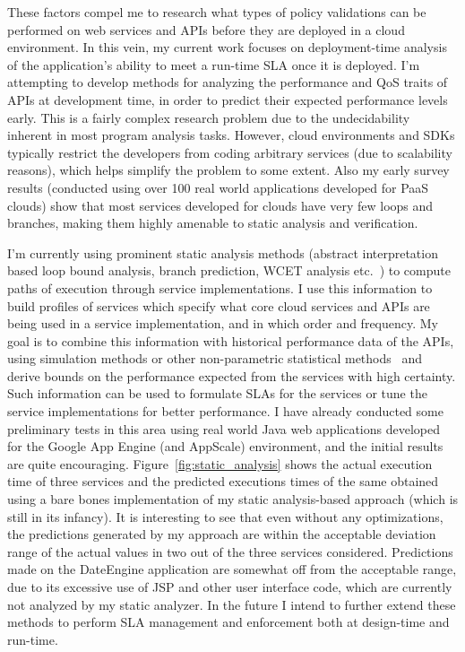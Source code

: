 These factors compel me to research what types of policy validations can be 
performed
on web services and APIs before they are deployed in a cloud environment.
In this vein, my current work focuses on deployment-time analysis of 
the application's
ability to meet a run-time SLA once it is deployed.  
I'm attempting to develop methods for analyzing the performance and
QoS traits of APIs at development time, in order to predict their expected performance 
levels early. This is a fairly complex research problem due to the undecidability
inherent in most program analysis tasks. However, cloud environments and SDKs
typically restrict the developers from coding arbitrary services (due to scalability reasons), 
which helps simplify the problem to some extent. Also my early survey results (conducted using
over 100 real world applications developed for PaaS clouds) show that most services developed for
clouds have very few loops and branches, making them highly amenable to static analysis and
verification.

I'm currently using
prominent static analysis methods (abstract interpretation based loop bound analysis,
branch prediction, WCET analysis etc.~\cite{ermedahl_et_al:OASIcs:2007:1194,Yeh:1991:TAT:123465.123475,bygde2010static}) 
to compute paths of execution through service 
implementations. I use this information to build profiles of services which
specify what core cloud services and APIs are being used in a service implementation,
and in which order and frequency. My goal is to combine this information with historical
performance data of the APIs, using simulation methods or other non-parametric statistical
methods~\cite{Nurmi:2007:QQB:1791551.1791556} and derive bounds on the performance expected from the services with high
certainty. 
Such information can be used to formulate SLAs for the services or tune
the service implementations for better performance. 
I have already conducted some preliminary tests in this area using real world
Java web applications developed for the Google App Engine (and AppScale) environment,
and the initial results are quite encouraging. Figure~\ref{fig:static_analysis} shows the actual
execution time of three services and the predicted executions times of the same obtained using
a bare bones implementation of my static analysis-based approach (which is still in its infancy). 
It is interesting
to see that even without any optimizations, the predictions generated by my approach are 
within the acceptable deviation range of the actual values in two out of the three services considered.
Predictions made on the DateEngine application are somewhat off from the acceptable range, due
to its excessive use of JSP and other user interface code, which are currently not analyzed by
my static analyzer.
In the future I intend to further extend 
these methods to perform SLA management and enforcement both at design-time and run-time.
